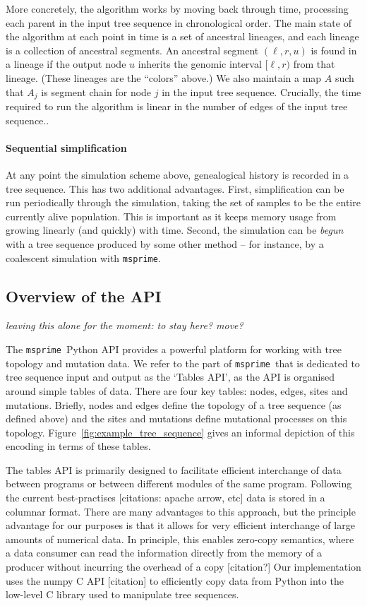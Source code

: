 \documentclass{article}
\newcommand{\msprime}{\texttt{msprime}}
\newcommand{\plr}[1]{{\em \color{blue} #1}}
\begin{document}
More concretely,
the algorithm works by moving back through time,
processing each parent in the input tree sequence in chronological order.
The main state of the algorithm at each point in time is a set of ancestral lineages,
and each lineage is a collection of ancestral segments.
An ancestral segment $(\ell, r, u)$ is found in a lineage
if the output node $u$ inherits the genomic interval $[\ell, r)$ from that lineage.
(These lineages are the ``colors'' above.)
We also maintain a map $A$ such that $A_j$ is segment chain for node $j$ in
the input tree sequence.
Crucially, the time required to run the algorithm is linear in the number of edges of the input tree sequence..

\paragraph{Sequential simplification}
At any point the simulation scheme above, genealogical history is recorded
in a tree sequence. This has two additional advantages. First, simplification
can be run periodically through the simulation, taking the set of samples to be
the entire currently alive population. This is important as it keeps memory
usage from growing linearly (and quickly) with time. Second, the simulation can
be \emph{begun} with a tree sequence produced by some other method -- for
instance, by a coalescent simulation with \msprime. 


\subsection*{Overview of the API}

\plr{leaving this alone for the moment: to stay here? move?}

The \msprime\ Python API provides a powerful platform for working with
tree topology and mutation data. We refer to the part of \msprime\
that is dedicated to tree sequence input and output as the `Tables API',
as the API is organised around simple tables of data. There are four key
tables: nodes, edges, sites and mutations. Briefly, nodes and edges define
the topology of a tree sequence (as defined above) and the sites and mutations
define mutational processes on this topology.
Figure~\ref{fig:example_tree_sequence} gives an informal depiction of this
encoding in terms of these tables.

The tables API is primarily designed to facilitate efficient interchange of
data between programs or between different modules of the same program.
Following the current best-practises [citations: apache arrow, etc] data is stored
in a columnar format. There are many advantages to this approach, but the
principle advantage for our purposes is that it allows for very efficient
interchange of large amounts of numerical data. In principle, this enables
zero-copy semantics, where a data consumer can read the information directly
from the memory of a producer without incurring the overhead of a copy
[citation?] Our implementation uses the numpy C API [citation] to efficiently copy
data from Python into the low-level C library used to manipulate
tree sequences.
\end{document}
